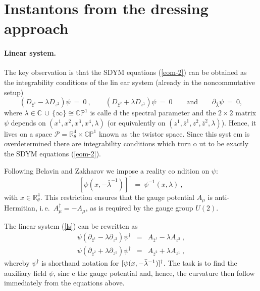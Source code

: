 \documentclass[a4paper,11pt,english]{article}
\numberwithin{equation}{section}
\renewcommand{\=}{\ =\ }
\begin{document}

\section{Instantons from the dressing approach}

\paragraph{Linear system.} The key observation is that the SDYM equations %
 (\ref{eom-2}) can be obtained as the integrability conditions of the lin%
ear system (already in the noncommutative setup)
\begin{equation}\label{ls}
 (D_{\bar{z}^1}-\lambda D_{z^2})\psi \=0\ , \qquad (D_{\bar{z}^2}+\lambda %
 D_{z^1})\psi \= 0
 \qquad\text{and}\qquad\partial_{\bar{\lambda}}\psi\=0,
\end{equation}
where $\lambda\in\mathbb{C}\,\cup\,\{\infty\}\cong\mathbb{CP}^1$ is calle%
d the spectral parameter and the $2{\times}2$ matrix $\psi$ depends on $(x%
^1, x^2, x^3, x^4, \lambda)$ (or equivalently on $(z^1,\bar{z}^1,z^2,\bar%
{z}^2,\lambda)$). Hence, it lives on a space $\mathcal{P}=\mathbb{R}%
^4_\theta\times\mathbb{CP}^1$ known as the twistor space. Since this syst%
em is overdetermined there are integrability conditions which turn o%
ut to be exactly the SDYM equations (\ref{eom-2}).

Following Belavin and Zakharov \cite{Belavin:cz} we impose a reality co%
ndition on $\psi$:
\begin{equation}\label{rc}
 [\psi(x,-\bar{\lambda}^{-1})]^\dagger\=\psi^{-1}(x,\lambda)\ ,
\end{equation}
with $x\in\mathbb{R}^4_\theta$. This restriction ensures that the %
 gauge potential ${A}_\mu$ is anti-Hermitian, i.\,e.\ ${A}^%
\dagger_\mu=-{A}_\mu$, as is required by the gauge group $U(2)$.

The linear system (\ref{ls}) can be rewritten as
\begin{subequations}\label{ls1}
\begin{eqnarray}
 \psi(\partial_{\bar{z}^1}-\lambda\partial_{z^2})\psi^\dagger &=&%
 {A}_{\bar{z}^1}-\lambda {A}_{z^2}\ ,\\
 \psi(\partial_{\bar{z}^2}+\lambda\partial_{z^1})\psi^\dagger &=&%
 {A}_{\bar{z}^2}+\lambda {A}_{z^1}\ ,
\end{eqnarray}
\end{subequations}
whereby $\psi^\dagger$ is shorthand notation for $[\psi(x,-\bar{\lambda}^%
{-1})]^\dagger$. The task is to find the auxiliary field $\psi$, sinc%
e the gauge potential and, hence, the curvature then follow immediately from %
the equations above.%
\end{document}
